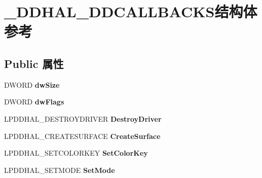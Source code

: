 \hypertarget{struct___d_d_h_a_l___d_d_c_a_l_l_b_a_c_k_s}{}\section{\+\_\+\+D\+D\+H\+A\+L\+\_\+\+D\+D\+C\+A\+L\+L\+B\+A\+C\+K\+S结构体 参考}
\label{struct___d_d_h_a_l___d_d_c_a_l_l_b_a_c_k_s}
\subsection*{Public 属性}
\begin{DoxyCompactItemize}
\item 
\mbox{\label{struct___d_d_h_a_l___d_d_c_a_l_l_b_a_c_k_s_a515104830b49112c348da18b0faa0b5e}} 
D\+W\+O\+RD {\bfseries dw\+Size}
\item 
\mbox{\label{struct___d_d_h_a_l___d_d_c_a_l_l_b_a_c_k_s_a02ad6971bc880ce62a26a45fd65e8c98}} 
D\+W\+O\+RD {\bfseries dw\+Flags}
\item 
\mbox{\label{struct___d_d_h_a_l___d_d_c_a_l_l_b_a_c_k_s_a013504a024cb618d02433f0f9f18cede}} 
L\+P\+D\+D\+H\+A\+L\+\_\+\+D\+E\+S\+T\+R\+O\+Y\+D\+R\+I\+V\+ER {\bfseries Destroy\+Driver}
\item 
\mbox{\label{struct___d_d_h_a_l___d_d_c_a_l_l_b_a_c_k_s_ad38dfd394cd497635788721d35d5705b}} 
L\+P\+D\+D\+H\+A\+L\+\_\+\+C\+R\+E\+A\+T\+E\+S\+U\+R\+F\+A\+CE {\bfseries Create\+Surface}
\item 
\mbox{\label{struct___d_d_h_a_l___d_d_c_a_l_l_b_a_c_k_s_a30dca5e845986ddb13990e76bf34d34d}} 
L\+P\+D\+D\+H\+A\+L\+\_\+\+S\+E\+T\+C\+O\+L\+O\+R\+K\+EY {\bfseries Set\+Color\+Key}
\item 
\mbox{\label{struct___d_d_h_a_l___d_d_c_a_l_l_b_a_c_k_s_a5ad9386884670bf7ec45e8815720c440}} 
L\+P\+D\+D\+H\+A\+L\+\_\+\+S\+E\+T\+M\+O\+DE {\bfseries Set\+Mode}
\item 
\mbox{\label{struct___d_d_h_a_l___d_d_c_a_l_l_b_a_c_k_s_a26602cf5c6b732bbfa707c4254b4d7db}} 

\end{DoxyCompactItemize}
